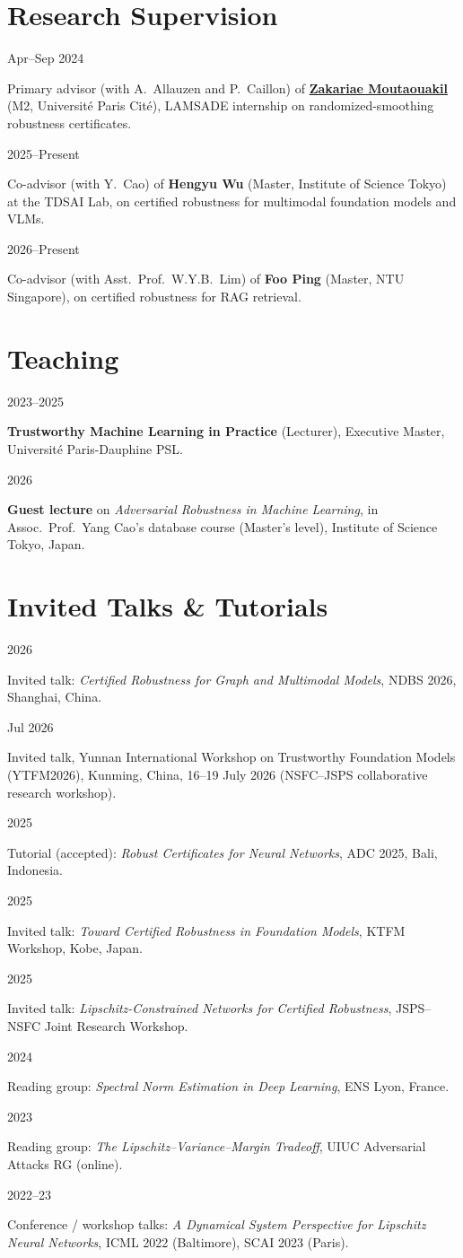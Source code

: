 \documentclass[10pt,a4paper]{article}
\newcommand{\cv}[2]{%
  \noindent\begin{minipage}[t]{0.135\textwidth}%
    \strut\raggedright\small\color{dategray} #1%
  \end{minipage}%
  \hspace{0.015\textwidth}%
  \begin{minipage}[t]{0.845\textwidth}%
    \strut #2%
  \end{minipage}\par\vspace{5pt}%
}
\begin{document}
\section{Research Supervision}
\cv{Apr–Sep 2024}{Primary advisor (with A.\ Allauzen and P.\ Caillon) of \href{https://team.inria.fr/i4s/team-members/zakariae-moutaouakil/}{\textbf{Zakariae Moutaouakil}} (M2, Université Paris Cité), LAMSADE internship on randomized-smoothing robustness certificates.}
\cv{2025–Present}{Co-advisor (with Y.\ Cao) of \textbf{Hengyu Wu} (Master, Institute of Science Tokyo) at the TDSAI Lab, on certified robustness for multimodal foundation models and VLMs.}
\cv{2026–Present}{Co-advisor (with Asst.\ Prof.\ W.Y.B.\ Lim) of \textbf{Foo Ping} (Master, NTU Singapore), on certified robustness for RAG retrieval.}

\section{Teaching}
\cv{2023–2025}{\textbf{Trustworthy Machine Learning in Practice} (Lecturer), Executive Master, Université Paris-Dauphine PSL.}
\cv{2026}{\textbf{Guest lecture} on \textit{Adversarial Robustness in Machine Learning}, in Assoc.\ Prof.\ Yang Cao's database course (Master's level), Institute of Science Tokyo, Japan.}

\newpage
\section{Invited Talks \& Tutorials}
\cv{2026}{Invited talk: \textit{Certified Robustness for Graph and Multimodal Models}, NDBS 2026, Shanghai, China.}
\cv{Jul 2026}{Invited talk, Yunnan International Workshop on Trustworthy Foundation Models (YTFM2026), Kunming, China, 16–19 July 2026 (NSFC–JSPS collaborative research workshop).}
\cv{2025}{Tutorial (accepted): \textit{Robust Certificates for Neural Networks}, ADC 2025, Bali, Indonesia.}
\cv{2025}{Invited talk: \textit{Toward Certified Robustness in Foundation Models}, KTFM Workshop, Kobe, Japan.}
\cv{2025}{Invited talk: \textit{Lipschitz-Constrained Networks for Certified Robustness}, JSPS–NSFC Joint Research Workshop.}
\cv{2024}{Reading group: \textit{Spectral Norm Estimation in Deep Learning}, ENS Lyon, France.}
\cv{2023}{Reading group: \textit{The Lipschitz–Variance–Margin Tradeoff}, UIUC Adversarial Attacks RG (online).}
\cv{2022–23}{Conference / workshop talks: \textit{A Dynamical System Perspective for Lipschitz Neural Networks}, ICML 2022 (Baltimore), SCAI 2023 (Paris).}
\end{document}
